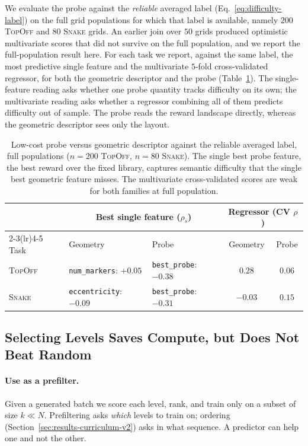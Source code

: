 \documentclass[twoside]{article}
\begin{document}
We evaluate the probe against the \emph{reliable} averaged label (Eq.~\ref{eq:difficulty-label}) on the full grid populations for which that label is available, namely $200$ \textsc{TopOff} and $80$ \textsc{Snake} grids. An earlier join over $50$ grids produced optimistic multivariate scores that did not survive on the full population, and we report the full-population result here. For each task we report, against the same label, the most predictive single feature and the multivariate $5$-fold cross-validated regressor, for both the geometric descriptor and the probe (Table~\ref{tab:probe}). The single-feature reading asks whether one probe quantity tracks difficulty on its own; the multivariate reading asks whether a regressor combining all of them predicts difficulty out of sample. The probe reads the reward landscape directly, whereas the geometric descriptor sees only the layout.

\begin{table}[h]
\centering
\caption{Low-cost probe versus geometric descriptor against the reliable averaged label, full populations ($n=200$ \textsc{TopOff}, $n=80$ \textsc{Snake}). The single best probe feature, the best reward over the fixed library, captures semantic difficulty that the single best geometric feature misses. The multivariate cross-validated scores are weak for both families at full population.}
\label{tab:probe}
\begin{tabular}{lll cc}
\toprule
& \multicolumn{2}{c}{Best single feature ($\rho_s$)} & \multicolumn{2}{c}{Regressor (CV $\rho$)} \\
\cmidrule(lr){2-3}\cmidrule(lr){4-5}
Task & Geometry & Probe & Geometry & Probe \\
\midrule
\textsc{TopOff} & \texttt{num\_markers}: $+0.05$ & \texttt{best\_probe}: $\mathbf{-0.38}$ & $0.28$ & $0.06$ \\
\textsc{Snake}  & \texttt{eccentricity}: $-0.09$ & \texttt{best\_probe}: $\mathbf{-0.31}$ & $-0.03$ & $0.15$ \\
\bottomrule
\end{tabular}
\end{table}

\subsection{Selecting Levels Saves Compute, but Does Not Beat Random}
\label{sec:results-curriculum}
\paragraph{Use as a prefilter.} Given a generated batch we score each level, rank, and train only on a subset of size $k \ll N$. Prefiltering asks \emph{which} levels to train on; ordering (Section~\ref{sec:results-curriculum-v2}) asks in what sequence. A predictor can help one and not the other.
\end{document}
